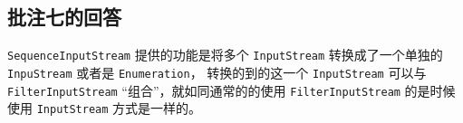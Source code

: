 
\subsection{批注七的回答}
\label{sec:fix:lb7}

\lstinline|SequenceInputStream| 提供的功能是将多个 \lstinline|InputStream| 转换成了一个单独的 \lstinline|InpuStream| 或者是 \lstinline|Enumeration|，
转换的到的这一个 \lstinline|InputStream| 可以与 \lstinline|FilterInputStream| “组合”，就如同通常的的使用 \lstinline|FilterInputStream| 的是时候使用 \lstinline|InputStream|
方式是一样的。 